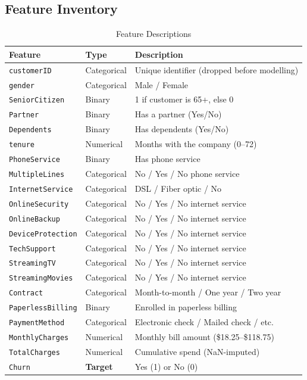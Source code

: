 \documentclass[12pt,a4paper]{article}
\begin{document}
\subsection{Feature Inventory}

\begin{table}[H]
\centering
\caption{Feature Descriptions}
\begin{tabularx}{\textwidth}{llX}
    \toprule
    \textbf{Feature} & \textbf{Type} & \textbf{Description} \\
    \midrule
    \texttt{customerID}        & Categorical & Unique identifier (dropped before modelling) \\
    \texttt{gender}            & Categorical & Male / Female \\
    \texttt{SeniorCitizen}     & Binary      & 1 if customer is 65+, else 0 \\
    \texttt{Partner}           & Binary      & Has a partner (Yes/No) \\
    \texttt{Dependents}        & Binary      & Has dependents (Yes/No) \\
    \texttt{tenure}            & Numerical   & Months with the company (0--72) \\
    \texttt{PhoneService}      & Binary      & Has phone service \\
    \texttt{MultipleLines}     & Categorical & No / Yes / No phone service \\
    \texttt{InternetService}   & Categorical & DSL / Fiber optic / No \\
    \texttt{OnlineSecurity}    & Categorical & No / Yes / No internet service \\
    \texttt{OnlineBackup}      & Categorical & No / Yes / No internet service \\
    \texttt{DeviceProtection}  & Categorical & No / Yes / No internet service \\
    \texttt{TechSupport}       & Categorical & No / Yes / No internet service \\
    \texttt{StreamingTV}       & Categorical & No / Yes / No internet service \\
    \texttt{StreamingMovies}   & Categorical & No / Yes / No internet service \\
    \texttt{Contract}          & Categorical & Month-to-month / One year / Two year \\
    \texttt{PaperlessBilling}  & Binary      & Enrolled in paperless billing \\
    \texttt{PaymentMethod}     & Categorical & Electronic check / Mailed check / etc. \\
    \texttt{MonthlyCharges}    & Numerical   & Monthly bill amount (\$18.25--\$118.75) \\
    \texttt{TotalCharges}      & Numerical   & Cumulative spend (NaN-imputed) \\
    \texttt{Churn}             & \textcolor{churnred}{\textbf{Target}} & Yes (1) or No (0) \\
    \bottomrule
\end{tabularx}
\end{table}
\end{document}
